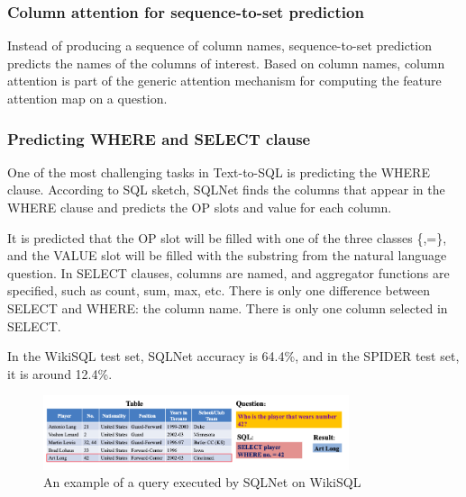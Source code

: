 \subsubsection*{Column attention for sequence-to-set prediction}

Instead of producing a sequence of column names, sequence-to-set prediction predicts the names of the columns of interest.
Based on column names, column attention is part of the generic attention mechanism for computing the feature attention map on a question.

\subsubsection*{Predicting WHERE and SELECT clause}

One of the most challenging tasks in Text-to-SQL is predicting the WHERE clause.
According to SQL sketch, SQLNet finds the columns that appear in the WHERE clause and predicts the OP slots and value for each column.

It is predicted that the OP slot will be filled with one of the three classes \{<,>,=\}, and the VALUE slot will be filled with the substring from the natural language question.
In SELECT clauses, columns are named, and aggregator functions are specified, such as count, sum, max, etc. There is only one difference between SELECT and WHERE: the column name. There is only one column selected in SELECT.

In the WikiSQL test set, SQLNet accuracy is 64.4\%, and in the SPIDER test set, it is around 12.4\%.

\begin{figure}[H]
    \centering
    \includegraphics[width=0.8\textwidth]{pics/sqlnet/sqlnet-task.png}
    \caption{An example of a query executed by SQLNet on WikiSQL\cite{xu_sqlnet_2017}}
    \label{fig:sqlnet-task}
\end{figure}